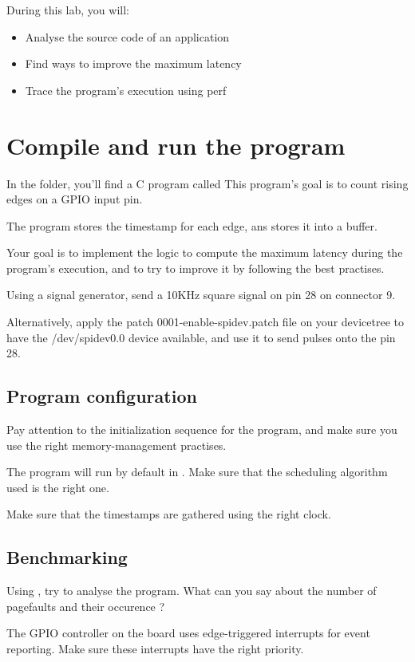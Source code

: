 
During this lab, you will:
\begin{itemize}
  \item Analyse the source code of an application
  \item Find ways to improve the maximum latency
  \item Trace the program's execution using perf
\end{itemize}

\section{Compile and run the program}

In the  folder, you'll find a C program called 
This program's goal is to count rising edges on a GPIO input pin.

The program stores the timestamp for each edge, ans stores it into a buffer.

Your goal is to implement the logic to compute the maximum latency during the
program's execution, and to try to improve it by following the best practises.

Using a signal generator, send a 10KHz square signal on pin 28 on connector 9.

Alternatively, apply the patch 0001-enable-spidev.patch file on your devicetree
to have the /dev/spidev0.0 device available, and use it to send pulses onto the
pin 28.

\subsection{Program configuration}

Pay attention to the initialization sequence for the program, and make sure you
use the right memory-management practises.

The program will run by default in . Make sure that the scheduling
algorithm used is the right one.

Make sure that the timestamps are gathered using the right clock.

\subsection{Benchmarking}

Using , try to analyse the program. What can you say about the number
of pagefaults and their occurence ?

The GPIO controller on the board uses edge-triggered interrupts for event
reporting. Make sure these interrupts have the right priority.

